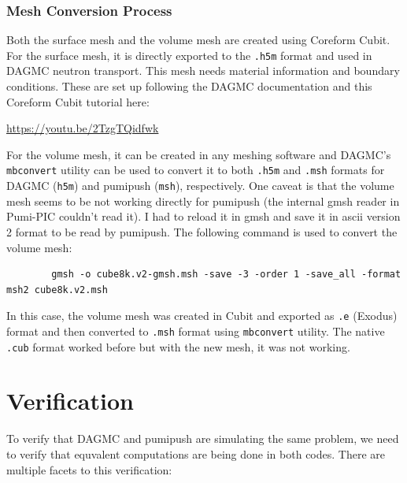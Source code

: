 \documentclass{article}
\begin{document}
\subsubsection{Mesh Conversion Process}
Both the surface mesh and the volume mesh are created using Coreform Cubit. For the surface mesh, it is directly exported
to the \texttt{.h5m} format
and used in DAGMC neutron transport. This mesh needs material information and boundary conditions. These are set up following
the DAGMC documentation and this Coreform Cubit tutorial here:
\begin{tcolorbox}[colback=white, colframe=black, title=Cubit Tutorial]
	\url{https://youtu.be/2TzgTQidfwk}
\end{tcolorbox}

For the volume mesh, it can be created in any meshing software and DAGMC's \texttt{mbconvert} utility can be used to convert it to
both \texttt{.h5m} and \texttt{.msh} formats for DAGMC (\texttt{h5m}) and pumipush (\texttt{msh}), respectively. One caveat is that
the volume mesh seems to be
not working directly for pumipush (the internal gmsh reader in Pumi-PIC couldn't read it). I had to reload it in gmsh and save it
in ascii version 2 format to be read by pumipush. The following command is used to convert the volume mesh:
\begin{tcolorbox}[colback=white, colframe=black, title=Mesh Conversion Command]
	\begin{verbatim}
		gmsh -o cube8k.v2-gmsh.msh -save -3 -order 1 -save_all -format msh2 cube8k.v2.msh
	\end{verbatim}
\end{tcolorbox}

In this case, the volume mesh was created in Cubit and exported as \texttt{.e} (Exodus) format and then converted to \texttt{.msh} format
using \texttt{mbconvert} utility. The native \texttt{.cub} format worked before but with the new mesh, it was not working.

\section{Verification}
To verify that DAGMC and pumipush are simulating the same problem, we need to verify that equvalent computations are
being done in both codes. There are multiple facets to this verification:
\end{document}
